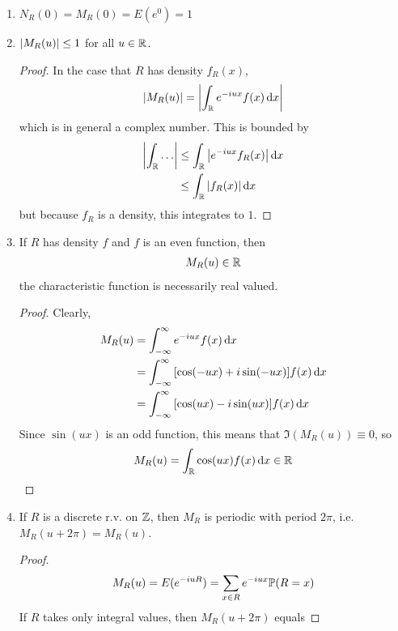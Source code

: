 \begin{enumerate}
    \item $N_R(0) = M_R(0) = E(e^0) = 1$
    \item $\abs{M_R(u)} \le 1$ for all $u \in \mathbb{R}$.
    \begin{proof}
        In the case that $R$ has density $f_R(x)$,
        \begin{align}
            \abs{M_R(u)} = \abs{\int_{\mathbb{R}} e^{-iux} f(x) \dd{x}}
        \end{align}
        which is in general a complex number. This is bounded by
        \begin{align}
            \abs{\int_{\mathbb{R}} \ldots} &\le \int_{\mathbb{R}} \abs{e^{-iux} f_R(x)} \dd{x}\\
            &\le \int_{\mathbb{R}} \abs{f_R(x)} \dd{x}
        \end{align}
        but because $f_R$ is a density, this integrates to $1$.
    \end{proof}
    \item If $R$ has density $f$ and $f$ is an even function, then
    \begin{align}
        M_R(u) \in \mathbb{R}
    \end{align}
    the characteristic function is necessarily real valued.
    \begin{proof}
        Clearly,
        \begin{align}
            M_R(u) &= \int_{-\infty}^\infty e^{-iux} f(x) \dd{x}\\
            &= \int_{-\infty}^\infty \qty[\cos(-ux) + i\sin(-ux)] f(x) \dd{x}\\
            &= \int_{-\infty}^\infty \qty[\cos(ux) - i\sin(ux)] f(x) \dd{x}
        \end{align}
        Since $\sin(ux)$ is an odd function, this means that $\Im(M_R(u)) \equiv 0$, so
        \begin{align}
            M_R(u) = \int_{\mathbb{R}} \cos(ux) f(x) \dd{x} \in \mathbb{R}
        \end{align}
    \end{proof}
    \item If $R$ is a discrete r.v. on $\mathbb{Z}$, then $M_R$ is periodic with period $2\pi$, i.e. $M_R(u + 2\pi) = M_R(u)$.
    \begin{proof}
        \begin{align}
            M_R(u) = E(e^{-iuR}) = \sum_{x \in R} e^{-iux} \mathbb{P}(R = x)
        \end{align}
        If $R$ takes only integral values, then $M_R(u + 2\pi)$ equals

\end{proof}
\end{enumerate}
